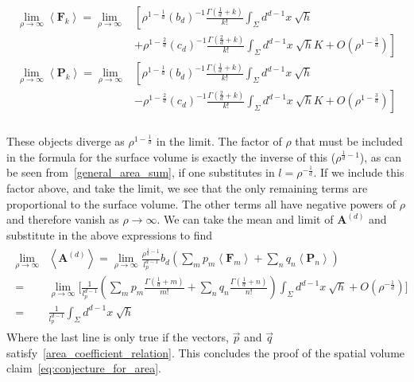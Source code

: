 \documentclass[12pt]{article}
\newcommand{\BF}[1]{\mathbf{F}_{#1}}
\newcommand{\BP}[1]{\mathbf{P}_{#1}}
\begin{document}
\begin{gather}\label{eq:nmax_nmin_final}
\begin{aligned}
\lim_{\rho\rightarrow\infty}\left\langle \BF{k}\right\rangle = \lim_{\rho\rightarrow\infty} & \left[ \rho^{1-\frac{1}{d}} \left (b_d\right)^{-1} \frac{\Gamma\left (\frac{1}{d}+k\right)}{k!}
\int_{\Sigma}d^{d-1}x\: \sqrt{h} \right.
 \\
 &  \left. +\rho^{1-\frac{2}{d}} \left (c_d\right)^{-1} \frac{\Gamma\left (\frac{2}{d}+k\right)}{k!}
\int_{\Sigma}d^{d-1}x\: \sqrt{h}K + O\left (\rho^{1-\frac{3}{d}} \right) \right]
\\
\lim_{\rho\rightarrow\infty}\left\langle \BP{k}\right\rangle = \lim_{\rho\rightarrow\infty} & \left[ \rho^{1-\frac{1}{d}} \left (b_d\right)^{-1} \frac{\Gamma\left (\frac{1}{d}+k\right)}{k!}
\int_{\Sigma}d^{d-1}x\: \sqrt{h} \right.
 \\
 &  \left. -\rho^{1-\frac{2}{d}} \left (c_d\right)^{-1} \frac{\Gamma\left (\frac{2}{d}+k\right)}{k!}
\int_{\Sigma}d^{d-1}x\: \sqrt{h}K + O\left (\rho^{1-\frac{3}{d}} \right) \right]
\\
\end{aligned}
\end{gather}

These objects diverge as $\rho^{1-\frac{1}{d}}$ in the limit. The factor of $\rho$ that must be included in the formula for the surface volume is exactly the inverse of this ($\rho^{\frac{1}{d}-1}$), as can be seen from~\eqref{general_area_sum}, if one substitutes in $l=\rho^{-\frac{1}{d}}$. If we include this factor above, and take the limit, we see that the only remaining terms are proportional to the surface volume. The other terms all have negative powers of $\rho$ and therefore vanish as $\rho\rightarrow\infty$. We can take the mean and limit of $\textbf{A}^{ (d)}$ and substitute in the above expressions to find
\begin{gather}\label{eq:area_final_proof}
\begin{aligned}
\lim_{\rho\rightarrow\infty} & \left\langle \textbf{A}^{ (d)}\right\rangle = \lim_{\rho\rightarrow\infty} \frac{\rho^{\frac{1}{d}-1}}{l_p^{d-1}} b_{d}\left (\sum_m p_m \left\langle\textbf{F}_m\right\rangle  + \sum_n q_n \left\langle\textbf{P}_n\right\rangle\right)
\\
= & \lim_{\rho\rightarrow\infty}\Bigg[ \frac{1}{l_p^{d-1}} \left(\sum_m p_m \frac{\Gamma\left (\frac{1}{d}+m \right)}{m!}  + \sum_n q_n\frac{\Gamma\left (\frac{1}{d}+n \right)}{n!} \right) \int_{\Sigma}d^{d-1}x\: \sqrt{h}+O(\rho^{-\frac{1}{d}})\Bigg]
\\
= & \frac{1}{l_p^{d-1}}\int_{\Sigma}d^{d-1}x\: \sqrt{h}
\end{aligned}
\end{gather}
Where the last line is only true if the vectors, $\vec{p}$ and $\vec{q}$ satisfy~\eqref{area_coefficient_relation}. This concludes the proof of the spatial volume claim~\eqref{eq:conjecture_for_area}. 
\end{document}

